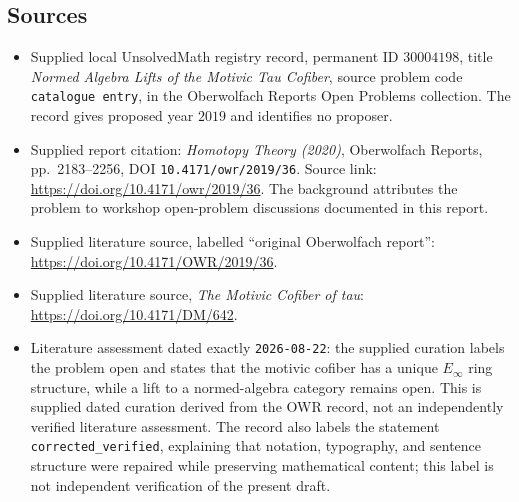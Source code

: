 \documentclass[11pt]{article}
\begin{document}
\subsection{Sources}
\begin{itemize}
\item Supplied local UnsolvedMath registry record, permanent ID \(30004198\), title \emph{Normed Algebra Lifts of the Motivic Tau Cofiber}, source problem code \texttt{catalogue entry}, in the Oberwolfach Reports Open Problems collection. The record gives proposed year \(2019\) and identifies no proposer.
\item Supplied report citation: \emph{Homotopy Theory (2020)}, Oberwolfach Reports, pp.\ 2183--2256, DOI \texttt{10.4171/owr/2019/36}. Source link: \url{https://doi.org/10.4171/owr/2019/36}. The background attributes the problem to workshop open-problem discussions documented in this report.
\item Supplied literature source, labelled ``original Oberwolfach report'': \url{https://doi.org/10.4171/OWR/2019/36}.
\item Supplied literature source, \emph{The Motivic Cofiber of tau}: \url{https://doi.org/10.4171/DM/642}.
\item Literature assessment dated exactly \texttt{2026-08-22}: the supplied curation labels the problem open and states that the motivic cofiber has a unique \(E_\infty\) ring structure, while a lift to a normed-algebra category remains open. This is supplied dated curation derived from the OWR record, not an independently verified literature assessment. The record also labels the statement \texttt{corrected\_verified}, explaining that notation, typography, and sentence structure were repaired while preserving mathematical content; this label is not independent verification of the present draft.
\end{itemize}
\end{document}
